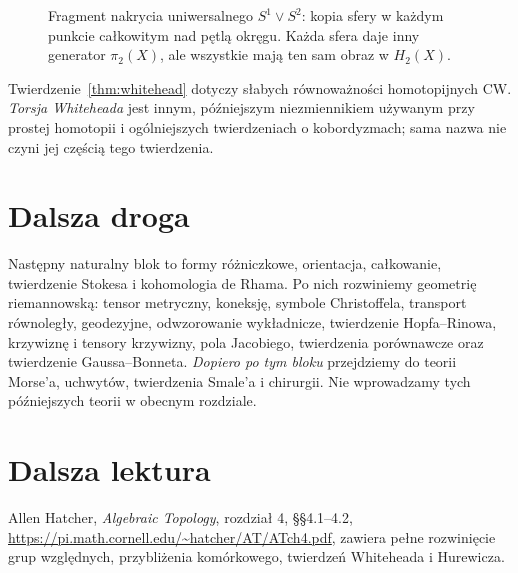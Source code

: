 \begin{figure}[!htbp]
\centering
{}
\caption{Fragment nakrycia uniwersalnego
$S^1\vee S^2$: kopia sfery w każdym
punkcie całkowitym nad pętlą okręgu.
Każda sfera daje inny generator
$\pi_2(X)$, ale wszystkie mają
ten sam obraz w $H_2(X)$.}
\label{fig:nakrycie-bukiet-sfer}
\end{figure}

\begin{uwaga}
Twierdzenie~\ref{thm:whitehead}
dotyczy słabych równoważności
homotopijnych CW.
\emph{Torsja Whiteheada}
jest innym, późniejszym
niezmiennikiem używanym
przy prostej homotopii
i ogólniejszych
twierdzeniach o
kobordyzmach; sama
nazwa nie czyni jej
częścią tego twierdzenia.
\end{uwaga}

\section*{Dalsza droga}
Następny naturalny blok to
formy różniczkowe,
orientacja, całkowanie,
twierdzenie Stokesa
i kohomologia de Rhama.
Po nich rozwiniemy
geometrię riemannowską:
tensor metryczny, koneksję,
symbole Christoffela,
transport równoległy,
geodezyjne, odwzorowanie
wykładnicze, twierdzenie
Hopfa--Rinowa, krzywiznę
i tensory krzywizny,
pola Jacobiego,
twierdzenia porównawcze
oraz twierdzenie
Gaussa--Bonneta.
\emph{Dopiero po tym bloku}
przejdziemy do teorii
Morse'a, uchwytów,
twierdzenia Smale'a
i chirurgii.
Nie wprowadzamy
tych późniejszych
teorii w obecnym rozdziale.

\section*{Dalsza lektura}
Allen Hatcher,
\emph{Algebraic Topology},
rozdział 4, §§4.1--4.2,
\url{https://pi.math.cornell.edu/~hatcher/AT/ATch4.pdf},
zawiera pełne rozwinięcie
grup względnych,
przybliżenia komórkowego,
twierdzeń Whiteheada
i Hurewicza.
\clearpage

